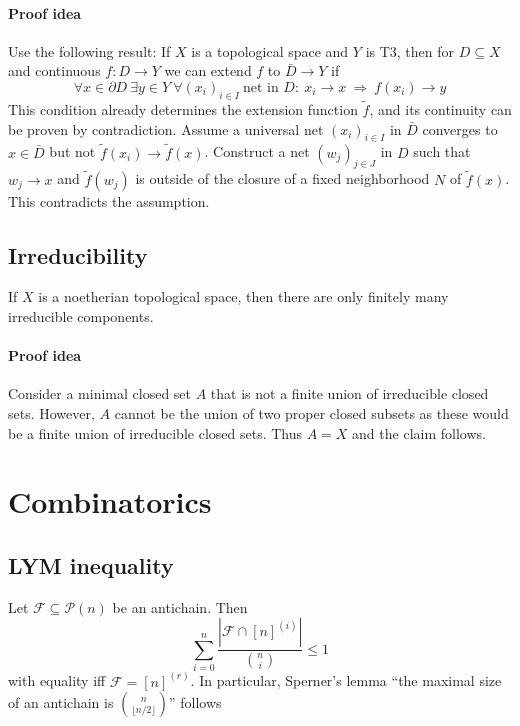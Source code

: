 \documentclass{scrartcl}
\begin{document}
\paragraph{Proof idea} Use the following result: If $X$ is a topological space and $Y$ is T3, then for $D \subseteq X$ and continuous $f: D \to Y$ we can extend $f$ to $\bar{D} \to Y$ if 
\begin{equation*}
    \forall x \in \partial D \ \exists y \in Y \ \forall (x_i)_{i \in I} \ \text{net in $D$}: \ x_i \to x \ \Rightarrow \ f(x_i) \to y
\end{equation*}
This condition already determines the extension function $\tilde{f}$, and its continuity can be proven by contradiction. Assume a universal net $(x_i)_{i \in I}$ in $\bar{D}$ converges to $x \in \bar{D}$ but not $\tilde{f}(x_i) \to \tilde{f}(x)$. Construct a net $(w_j)_{j \in J}$ in $D$ such that $w_j \to x$ and $\tilde{f}(w_j)$ is outside of the closure of a fixed neighborhood $N$ of $\tilde{f}(x)$. This contradicts the assumption.

\subsection{Irreducibility}
If $X$ is a noetherian topological space, then there are only finitely many irreducible components.
\paragraph{Proof idea} Consider a minimal closed set $A$ that is not a finite union of irreducible closed sets.
However, $A$ cannot be the union of two proper closed subsets as these would be a finite union of irreducible closed sets.
Thus $A = X$ and the claim follows.

\section{Combinatorics}

\subsection{LYM inequality}
Let $\mathcal{F} \subseteq \mathcal{P}(n)$ be an antichain. Then
\begin{equation*}
    \sum_{i = 0}^n \frac {| \mathcal{F} \cap [n]^{(i)} |} {{n \choose i}} \leq 1
\end{equation*}
with equality iff $\mathcal{F} = [n]^{(r)}$. 
In particular, Sperner's lemma ``the maximal size of an antichain is ${n \choose \lfloor n/2 \rfloor}$'' follows
\end{document}
